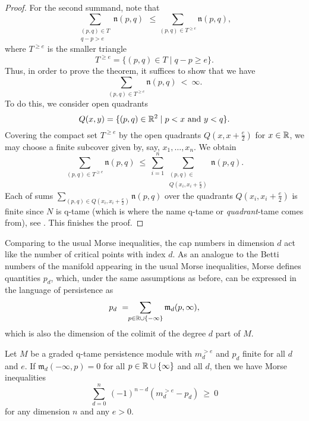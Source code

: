 \begin{proof}
    For the second summand, note that  
    \[
    \sum_{ \substack{ (p,q) \in T \\ q-p > e } } \mathfrak{n} (p,q)
    \ \, \leq \!\!
    \sum_{(p,q) \in T^{\geq e}} \mathfrak{n} (p,q),
    \]
    where $T^{\geq e}$ is the smaller triangle 
    \[
    T^{\geq e} = \{(p,q) \in T \mid q-p \geq e\}.
    \]
    Thus, in order to prove the theorem, it suffices to show that we have 
    \[
    \sum_{(p,q) \in T^{\geq e}} \mathfrak{n} (p,q) 
    \ < \ 
    \infty.
    \]
    To do this, we consider open quadrants 
    \[
    Q(x, y) = \{ (p, q) \in \mathbb{R}^2 \mid p < x \text{ and } y < q \}.
    \]
    Covering the compact set $T^{\geq e}$ by the open quadrants $Q \left(x, x + \frac{e}{2} \right)$ for $x \in \mathbb{R}$, we may choose a finite subcover given by, say, $x_1,\dots, x_n$. We obtain
    \[
    \sum_{(p,q) \in T^{\geq e}} \mathfrak{n} (p,q) 
    \ \leq \
    \sum_{i=1}^n \sum_{\substack{(p, q) \in \\ Q (x_i, x_i + \frac{e}{2})}} \mathfrak{n}(p,q). 
    \]
    Each of sums $\sum_{(p,q) \in Q \left(x_i, x_i + \frac{e}{2} \right)} \mathfrak{n}(p,q)$ over the quadrants $Q \left(x_i, x_i + \frac{e}{2} \right)$ is finite since $N$ is q-tame (which is where the name q-tame or \emph{quadrant}-tame comes from), see \cite[Section 3.8]{Chazal.2016a}. This finishes the proof.
\end{proof}


Comparing to the usual Morse inequalities, the cap numbers in dimension $d$ act like the number of critical points with index $d$. As an analogue to the Betti numbers of the manifold appearing in the usual Morse inequalities, Morse defines quantities $p_{d}$, which, under the same assumptions as before, can be expressed in the language of persistence as
\[
p_{d} \ = \!\! \sum_{p \in \mathbb{R} \cup \{-\infty\}} \mathfrak{m}_d(p,\infty),
\]
which is also the dimension of the colimit of the degree $d$ part of $M$.

\begin{thm}
    Let $M$ be a graded q-tame persistence module with $m_{d}^{> e }$ and $p_{d}$ finite for all $d$ and $e$. If $\mathfrak{m}_d(-\infty, p) = 0$ for all $p \in \mathbb{R} \cup \{\infty\}$ and all $d$, then we have Morse inequalities
    \begin{equation} \label{e:morse inequalities}
        \sum_{d=0}^n \ (-1)^{n-d} (m^{>e}_{d} - p_{d}) \ \geq\  0
    \end{equation}
    for any dimension $n$ and any $e > 0$.
\end{thm}

